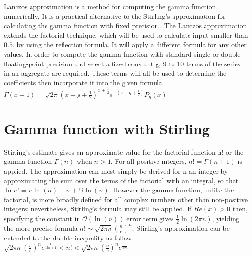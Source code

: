 \documentclass[12pt,a4paper]{report}
\begin{document}
Lanczos approximation is a method for computing the gamma function numerically, It is a practical alternative to the Stirling's approximation for calculating the gamma function with fixed precision.. The Lanczos approximation extends the factorial technique, which will be used to calculate input smaller than $0.5$, by using the reflection formula. It will apply a different formula for any other values. In order to compute the gamma function with standard single or double floating-point precision and select a fixed constant g, 9 to 10 terms of the series in an aggregate are required. These terms will all be used to determine the coefficients then incorporate it into the given formula ${\displaystyle \Gamma (x+1)={\sqrt {2\pi }}{\left(x+g+{\tfrac {1}{2}}\right)}^{x+{\frac {1}{2}}}e^{-\left(x+g+{\frac {1}{2}}\right)}P_{g}(x)}$.

\section{Gamma function with Stirling}

Stirling's estimate gives an approximate value for the factorial function n! or the gamma function $\Gamma(n)$ when $n>1$. For all positive integers, ${\displaystyle n!=\Gamma (n+1)}$ is applied. The approximation can most simply be derived for n an integer by approximating the sum over the terms of the factorial with an integral, so that ${\displaystyle \ln n! = n \ln(n) - n + \Theta \ln(n)}$. However  the gamma function, unlike the factorial, is more broadly defined for all complex numbers other than non-positive integers; nevertheless, Stirling's formula may still be applied. If $Re(x) > 0$ then, specifying the constant in $\mathcal{O}(\ln(n))$ error term gives $\frac{1}{2}\ln(2\pi n)$, yielding the more precise formula $n! \sim \sqrt {2\pi n} (\frac{n}{e})^n$. Stirling's approximation can be extended to the double inequality as follow $\sqrt {2\pi n} (\frac{n}{e})^n  e^\frac{1}{12n + 1} < n! < \sqrt {2\pi n} (\frac{n}{e})^n  e^\frac{1}{12n}$ 
\end{document}
